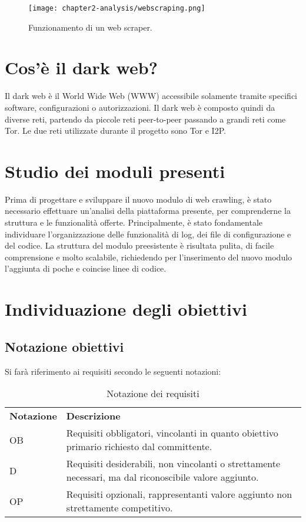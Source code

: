 \begin{figure}[!h] 
    \centering 
    \texttt{[image: chapter2-analysis/webscraping.png]} 
    \caption{Funzionamento di un web scraper.}
\end{figure}

\section{Cos'è il dark web?}
Il dark web è il World Wide Web (WWW) accessibile solamente tramite specifici software, configurazioni o autorizzazioni. Il dark web è composto quindi da diverse reti, partendo da piccole reti peer-to-peer passando a grandi reti come Tor. Le due reti utilizzate durante il progetto sono Tor e I2P.
\section{Studio dei moduli presenti}

Prima di progettare e sviluppare il nuovo modulo di web crawling, è stato necessario effettuare un’analisi della piattaforma presente, per comprenderne la struttura e le funzionalità offerte. Principalmente, è stato fondamentale individuare l'organizzazione delle funzionalità di log, dei file di configurazione e del codice. La struttura del modulo preesistente è risultata pulita, di facile comprensione e molto scalabile, richiedendo per l'inserimento del nuovo modulo l'aggiunta di poche e coincise linee di codice.

\section{Individuazione degli obiettivi}

\subsection{Notazione obiettivi}
Si farà riferimento ai requisiti secondo le seguenti notazioni:
\begin{longtable}{|p{}|p{}|}
	\caption{Notazione dei requisiti}
	\label{tab:notazione-requisiti} \\
	\hline
    \textbf{Notazione}	&	\textbf{Descrizione} \\
    OB			&	Requisiti obbligatori, vincolanti in quanto obiettivo primario richiesto dal committente. \\  
	\hline
    D			&	Requisiti desiderabili, non vincolanti o strettamente necessari, ma dal riconoscibile valore aggiunto. \\ 
	\hline
    OP			&	Requisiti opzionali, rappresentanti valore aggiunto non strettamente competitivo. \\
    \hline
\end{longtable}%

